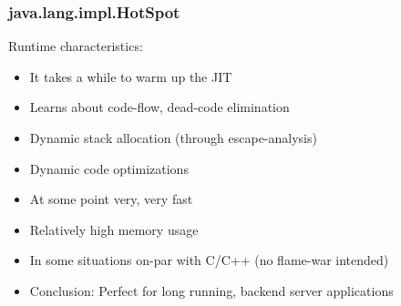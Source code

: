 \begin{frame}
  \frametitle{java.lang.impl.HotSpot}

  Runtime characteristics:
  \vspace{0.25cm}    
  \begin{itemize}
    \item It takes a while to warm up the JIT
    \vspace{0.3cm}    
    \item Learns about code-flow, dead-code elimination
    \vspace{0.3cm}    
    \item Dynamic stack allocation (through escape-analysis)
    \vspace{0.3cm}    
    \item Dynamic code optimizations
    \vspace{0.3cm}
    \item At some point very, very fast
    \vspace{0.3cm}
    \item Relatively high memory usage
    \vspace{0.3cm}
    \item In some situations on-par with C/C++ (no flame-war intended)
    \vspace{0.3cm}
    \item Conclusion: Perfect for long running, backend server applications
  \end{itemize}
\end{frame}